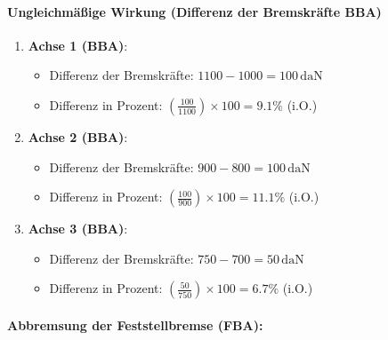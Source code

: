 \documentclass{vorlage-design-main}
\begin{document}
\paragraph{Ungleichmäßige Wirkung (Differenz der Bremskräfte
BBA)}\label{ungleichmaessige-wirkung-differenz-der-bremskraefte-bba}

\begin{enumerate}
\def\labelenumi{\arabic{enumi}.}

\item
  \textbf{Achse 1 (BBA)}:

  \begin{itemize}

  \item
    Differenz der Bremskräfte: $1100 - 1000 = 100 \, \text{daN}$
  \item
    Differenz in Prozent:
    $\left( \frac{100}{1100} \right) \times 100 = 9.1\%$ (i.O.)
  \end{itemize}
\item
  \textbf{Achse 2 (BBA)}:

  \begin{itemize}

  \item
    Differenz der Bremskräfte: $900 - 800 = 100 \, \text{daN}$
  \item
    Differenz in Prozent:
    $\left( \frac{100}{900} \right) \times 100 = 11.1\%$ (i.O.)
  \end{itemize}
\item
  \textbf{Achse 3 (BBA)}:

  \begin{itemize}

  \item
    Differenz der Bremskräfte: $750 - 700 = 50 \, \text{daN}$
  \item
    Differenz in Prozent:
    $\left( \frac{50}{750} \right) \times 100 = 6.7\%$ (i.O.)
  \end{itemize}
\end{enumerate}

\paragraph{Abbremsung der Feststellbremse
(FBA):}\label{abbremsung-der-feststellbremse-fba}
\end{document}
